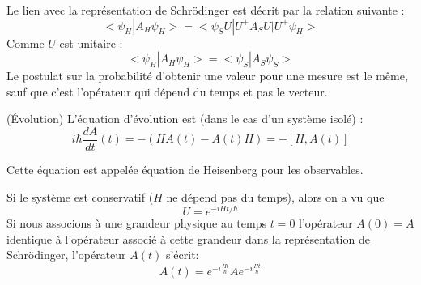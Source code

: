 \documentclass[12pt]{book}
\begin{document}
Le lien avec la repr\'esentation de Schr\"odinger est d\'ecrit par la
relation suivante :
\begin{equation}
<\psi_H|A_H\psi_H>=<\psi_SU|U^+A_SU|U^+\psi_H>
\end{equation}
Comme $U$ est unitaire :
\begin{equation}
<\psi_H|A_H\psi_H>=<\psi_S|A_S\psi_S>
\end{equation}
Le postulat sur la probabilit\'e d'obtenir une valeur pour une
mesure est le m\^eme, sauf que c'est l'op\'erateur qui d\'epend du
temps et pas le vecteur.
\begin{postulat}(\'Evolution)
L'\'equation d'\'evolution est (dans le cas d'un syst\`eme isol\'e) :
\begin{equation}
i\hbar \frac{dA}{dt}(t)=-(HA(t)-A(t)H)=-[H,A(t)]
\end{equation}
\end{postulat}
Cette \'equation est appel\'ee \'equation de Heisenberg pour les
observables. 
\begin{rem}
Si le syst\`eme est conservatif ($H$ ne d\'epend pas du temps), alors
on a vu que 
\begin{equation}
U=e^{-iHt/\hbar}
\end{equation}
Si nous associons \`a une grandeur physique au temps $t=0$
l'op\'erateur $A(0)=A$ identique \`a l'op\'erateur associ\'e \`a cette
grandeur dans la repr\'esentation de Schr\"odinger, l'op\'erateur
$A(t)$ s'\'ecrit:
\begin{equation}
A(t)=e^{+i\frac{Ht}{\hbar}}A e^{-i\frac{Ht}{\hbar}}
\end{equation}
\end{rem}
\end{document}
